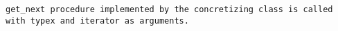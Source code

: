 
\tt{get_next} procedure implemented by the concretizing class
is called with \tt{typex} and \tt{iterator} as arguments.
